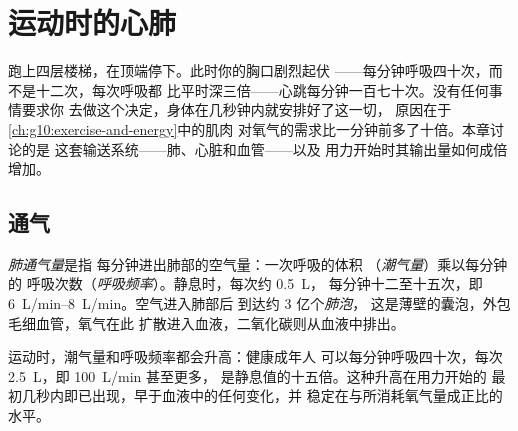 \chapter{运动时的心肺}\label{ch:g10:heart-lungs-effort}

跑上四层楼梯，在顶端停下。此时你的胸口剧烈起伏
——每分钟呼吸四十次，而不是十二次，每次呼吸都
比平时深三倍——心跳每分钟一百七十次。没有任何事情要求你
去做这个决定，身体在几秒钟内就安排好了这一切，
原因在于\cref{ch:g10:exercise-and-energy}中的肌肉
对氧气的需求比一分钟前多了十倍。本章讨论的是
这套输送系统——肺、心脏和血管——以及
用力开始时其输出量如何成倍增加。

\section{通气}

\begin{definition}[通气]\label{def:g10:heart-lungs-effort:ventilation}
\emph{肺通气量}是指
每分钟进出肺部的空气量：一次呼吸的体积
（\emph{潮气量}）乘以每分钟的
呼吸次数（\emph{呼吸频率}）。静息时，每次约 \qty{0.5}{L}，
每分钟十二至十五次，即 \qtyrange{6}{8}{L/min}。空气进入肺部后
到达约 3 亿个\emph{肺泡}，
这是薄壁的囊泡，外包毛细血管，氧气在此
扩散进入血液，二氧化碳则从血液中排出。
\end{definition}

\begin{proposition}[运动中的通气]\label{prop:g10:heart-lungs-effort:vent-exercise}
运动时，潮气量和呼吸频率都会升高：健康成年人
可以每分钟呼吸四十次，每次 \qty{2.5}{L}，即 \qty{100}{L/min} 甚至更多，
是静息值的十五倍。这种升高在用力开始的
最初几秒内即已出现，早于血液中的任何变化，并
稳定在与所消耗氧气量成正比的水平。
\end{proposition}
\admitted

